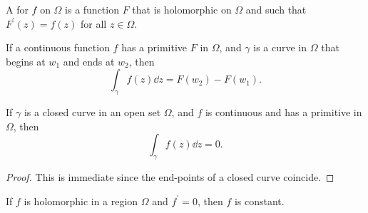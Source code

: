 A  for $f$ on $\Omega$ is a function $F$ that is holomorphic on $\Omega$ and such that $F^\prime(z)=f(z)$ for all $z\in\Omega$.

\begin{proposition}
If a continuous function $f$ has a primitive $F$ in $\Omega$, and $\gamma$ is a curve in $\Omega$ that begins at $w_1$ and ends at $w_2$, then
\begin{equation}
\int_{\gamma}f(z)\dd{z}=F(w_2)-F(w_1).
\end{equation}
\end{proposition}

\begin{corollary}
If $\gamma$ is a closed curve in an open set $\Omega$, and $f$ is continuous and has a primitive in $\Omega$, then
\[\int_{\gamma}f(z)\dd{z}=0.\]
\end{corollary}

\begin{proof}
This is immediate since the end-points of a closed curve coincide.
\end{proof}

\begin{corollary}
If $f$ is holomorphic in a region $\Omega$ and $f^\prime=0$, then $f$ is constant.
\end{corollary}